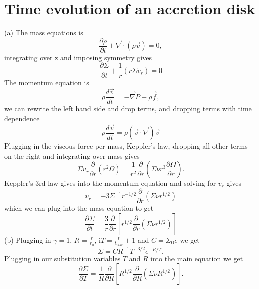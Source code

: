 \documentclass[11pt]{article}
\begin{document}
\section{Time evolution of an accretion disk}
\label{sec:orgc5ded80}
(a) The mass equations is
\begin{equation}
 \frac{\partial \rho}{\partial t} + \vec{\nabla} \cdot (\rho \vec{v}) = 0,
\end{equation}
integrating over z and imposing symmetry gives
\begin{equation}
 \frac{\partial \Sigma}{\partial t} + \frac{1}{r} (r \Sigma v_r) = 0
\end{equation}
The momentum equation is
\begin{equation}
 \rho \frac{d \vec{v}}{dt} = - \vec{\nabla} P + \rho \vec{f},
\end{equation}
we can rewrite the left hand side and drop terms, and  dropping terms with time dependence
\begin{equation}
 \rho \frac{d \vec{v}}{dt} = \rho (\vec{v} \cdot \vec{\nabla}) \vec{v}
\end{equation}
Plugging in the viscous force per mass, Keppler's law, dropping all other terms on the right and integrating over mass gives
\begin{equation}
 \Sigma v_r \frac{\partial }{\partial r} (r^2 \Omega) = \frac{1}{r^2}\frac{\partial }{\partial r} \left( \Sigma \nu r^3 \frac{\partial \Omega}{\partial r}  \right) .
\end{equation}
Keppler's 3rd law gives into the momentum equation and solving for \(v_r\) gives
\begin{equation}
 v_r = -3 \Sigma^{-1} r^{-1/2} \frac{\partial }{\partial r}(\Sigma \nu r^{1/2})
\end{equation}
which we can plug into the mass equation to get
\begin{equation}
 \frac{\partial \Sigma}{\partial t} = \frac{3}{r} \frac{\partial }{\partial r} \left[ r^{1/2} \frac{\partial }{\partial r} \left( \Sigma \nu r^{1/2} \right)  \right]
\end{equation}
\newline
(b) Plugging in \(\gamma = 1\), \(R = \frac{r}{r_0}\), i\(T = \frac{t}{t_{visc}} + 1\) and \(C = \Sigma_0 e\) we get
\begin{equation}
 \Sigma = C R^{-1} T^{-3/2} e^{-R / T}.
\end{equation}
Plugging in our substitution variables \(T\) and \(R\) into the main equation we get
\begin{equation}
 \frac{\partial \Sigma}{\partial T} = \frac{1}{R} \frac{\partial }{\partial R} \left[ R^{1/2} \frac{\partial }{\partial R} \left( \Sigma \nu R^{1/2} \right)  \right].
\end{equation}
\end{document}
